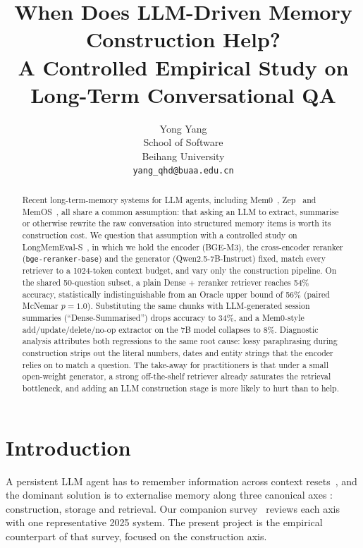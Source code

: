 \documentclass[11pt]{article}
\title{When Does {LLM}-Driven Memory Construction Help?\\
A Controlled Empirical Study on Long-Term Conversational QA}
\author{Yong Yang \\
  School of Software \\
  Beihang University \\
  \texttt{yang\_qhd@buaa.edu.cn}}
\begin{document}
\maketitle

\begin{abstract}
Recent long-term-memory systems for LLM agents, including
Mem0~\citep{chhikara2025mem0}, Zep~\citep{rasmussen2025zep} and
MemOS~\citep{li2025memos}, all share a common assumption: that asking
an LLM to extract, summarise or otherwise rewrite the raw conversation
into structured memory items is worth its construction cost. We
question that assumption with a controlled study on
LongMemEval-S~\citep{wu2024longmemeval}, in which we hold the encoder
(BGE-M3), the cross-encoder reranker (\texttt{bge-reranker-base}) and
the generator (Qwen2.5-7B-Instruct) fixed, match every retriever to a
1024-token context budget, and vary only the construction pipeline.
On the shared 50-question subset, a plain Dense + reranker retriever
reaches 54\% accuracy, statistically indistinguishable from an Oracle
upper bound of 56\% (paired McNemar $p=1.0$). Substituting the same
chunks with LLM-generated session summaries
(``Dense-Summarised'') drops accuracy to 34\%, and a Mem0-style
add/update/delete/no-op extractor on the 7B model collapses to 8\%.
Diagnostic analysis attributes both regressions to the same root
cause: lossy paraphrasing during construction strips out the
literal numbers, dates and entity strings that the encoder relies on
to match a question. The take-away for practitioners is that under a
small open-weight generator, a strong off-the-shelf retriever already
saturates the retrieval bottleneck, and adding an LLM construction
stage is more likely to hurt than to help.
\end{abstract}

\section{Introduction}
\label{sec:intro}

A persistent LLM agent has to remember information across context
resets~\citep{liu2023lost}, and the dominant solution is to
externalise memory along three canonical axes
\citep{li2025memos,chhikara2025mem0,rasmussen2025zep}: construction,
storage and retrieval. Our companion survey~\citep{yang2026survey}
reviews each axis with one representative 2025 system. The present
project is the empirical counterpart of that survey, focused on the
construction axis.
\end{document}
